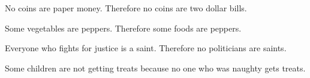 {\begin{exercises}
\item No coins are paper money. Therefore no coins are two dollar bills.


\item Some vegetables are peppers. Therefore some foods are peppers.



\item Everyone who fights for justice is a saint. Therefore no politicians are saints.
%


\item Some children are not getting treats because no one who was naughty gets treats.




\end{exercises}}
